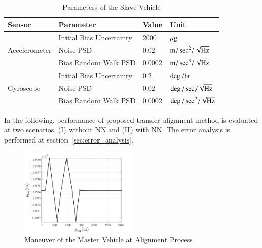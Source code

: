 \documentclass[3p]{elsarticle}
\begin{document}
\begin{table}[H]
	\centering
	\caption{
		Parameters of the Slave Vehicle
	}
		\begin{adjustbox}{max width=0.45\textwidth}
	\begin{tabular}{l|l|l|l}
		\hline
		\textbf{Sensor} & \textbf{Parameter} & \textbf{Value} & \textbf{Unit} \\
		\hline
		\multirow{3}{*}{Accelerometer} &  Initial Bias Uncertainty & 2000 & \(\mu \rm{g}\) \\
		& Noise PSD & 0.02 & \(\rm{m/\sec}^2/\sqrt{\rm{Hz}}\) \\
		& Bias Random Walk PSD & 0.0002 & \(\rm{m/\sec}^3/\sqrt{\rm{Hz}}\) \\
		\hline
		\multirow{3}{*}{Gyroscope} & Initial Bias Uncertainty & 0.2 & \(\rm{\deg/hr}\) \\
		 & Noise PSD & 0.02 & \({\deg/\sec}/\sqrt{\rm{Hz}}\) \\
		 & Bias Random Walk PSD & 0.0002 & \({\deg/\sec}^2/\sqrt{\rm{Hz}}\) \\
		\hline
	\end{tabular}\label{tab:slave_IMU_parameter}
\end{adjustbox}
	\end{table}




In the following, performance of proposed transfer alignment method is evaluated at two scenarios, \hyperref[subsec:NN_no]{(I)}
without NN and \hyperref[subsec:NN_used]{(II)} with NN\@. The error analysis is performed at section~\ref{sec:error_analysis}.
\begin{figure}[H]
	\centering
	\includegraphics[width=0.5\textwidth]{../Figure/trajectory}
	\caption{Maneuver of the Master Vehicle at Alignment Process}\label{fig:maneuver_TA}
\end{figure}
\end{document}
